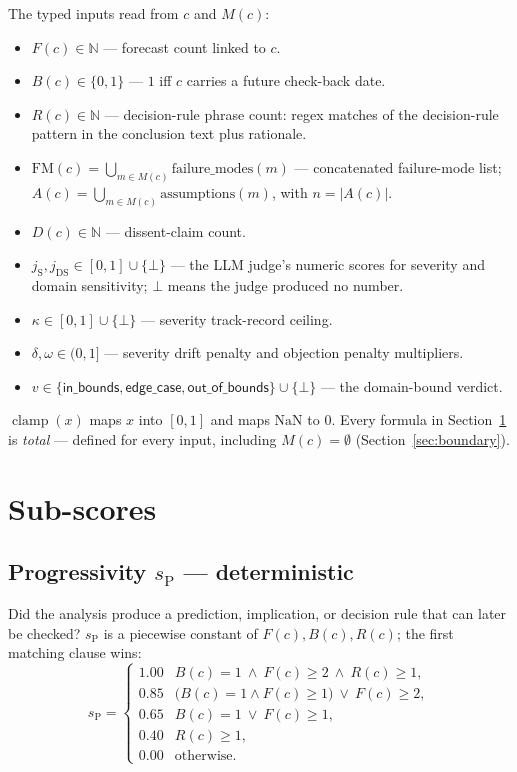 \documentclass[11pt]{article}
\newcommand{\sP}{s_{\mathrm{P}}}
\newcommand{\clip}{\operatorname{clamp}}
\begin{document}
The typed inputs read from $c$ and $M(c)$:
\begin{itemize}
  \item $F(c) \in \mathbb{N}$ --- forecast count linked to $c$.
  \item $B(c) \in \{0,1\}$ --- $1$ iff $c$ carries a future check-back date.
  \item $R(c) \in \mathbb{N}$ --- decision-rule phrase count: regex matches of
        the decision-rule pattern in the conclusion text plus rationale.
  \item $\mathrm{FM}(c) = \bigcup_{m \in M(c)} \mathrm{failure\_modes}(m)$ ---
        concatenated failure-mode list; $A(c) = \bigcup_{m \in M(c)}
        \mathrm{assumptions}(m)$, with $n = |A(c)|$.
  \item $D(c) \in \mathbb{N}$ --- dissent-claim count.
  \item $j_{\mathrm{S}}, j_{\mathrm{DS}} \in [0,1] \cup \{\bot\}$ --- the LLM
        judge's numeric scores for severity and domain sensitivity; $\bot$
        means the judge produced no number.
  \item $\kappa \in [0,1] \cup \{\bot\}$ --- severity track-record ceiling.
  \item $\delta, \omega \in (0,1]$ --- severity drift penalty and objection
        penalty multipliers.
  \item $v \in \{\textsf{in\_bounds}, \textsf{edge\_case},
        \textsf{out\_of\_bounds}\} \cup \{\bot\}$ --- the domain-bound verdict.
\end{itemize}

$\clip(x)$ maps $x$ into $[0,1]$ and maps $\mathrm{NaN}$ to $0$. Every formula
in Section~\ref{sec:subscores} is \emph{total} --- defined for every input,
including $M(c) = \emptyset$ (Section~\ref{sec:boundary}).

\section{Sub-scores}
\label{sec:subscores}

\subsection{Progressivity $\sP$ --- deterministic}

Did the analysis produce a prediction, implication, or decision rule that can
later be checked? $\sP$ is a piecewise constant of $F(c), B(c), R(c)$; the
first matching clause wins:
\begin{equation}
\label{eq:progressivity}
\sP =
\begin{cases}
1.00 & B(c)=1 \ \wedge\ F(c)\ge 2 \ \wedge\ R(c)\ge 1,\\[2pt]
0.85 & \bigl(B(c)=1 \wedge F(c)\ge 1\bigr) \ \vee\ F(c)\ge 2,\\[2pt]
0.65 & B(c)=1 \ \vee\ F(c)\ge 1,\\[2pt]
0.40 & R(c)\ge 1,\\[2pt]
0.00 & \text{otherwise}.
\end{cases}
\end{equation}
\end{document}
